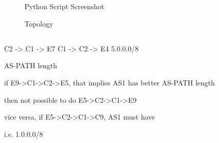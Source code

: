 \documentclass[12pt]{article}
\begin{document}
\newpage
\section{}

\renewcommand{\thesubsection}{\thesection.\alph{subsection}}

\subsection{}

\begin{figure}[h!]
  \caption{Python Script Screenshot}
  \label{fig:python-screenshot}
\end{figure}

\begin{figure}[h!]
  \caption{Topology}
  \label{fig:topology}
\end{figure}

\subsection{}


C2 -> C1 -> E7
C1 -> C2 -> E4 5.0.0.0/8





AS-PATH length

if E9->C1->C2->E5, that implies AS1 has better AS-PATH length

then not possible to do E5->C2->C1->E9

vice versa, if E5->C2->C1->C9, AS1 must have 

i.e. 1.0.0.0/8
\end{document}
